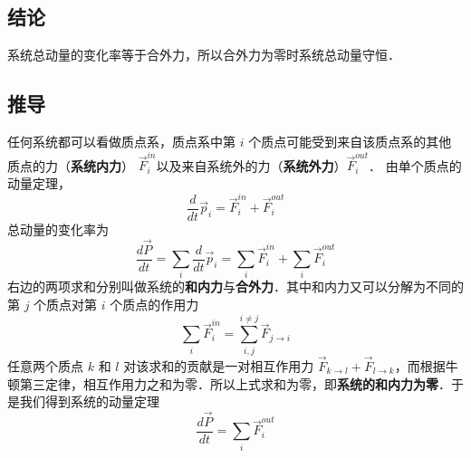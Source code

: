 \subsection{结论}
系统总动量的变化率等于合外力，所以合外力为零时系统总动量守恒．

\subsection{推导}
任何系统都可以看做质点系，质点系中第 $i$ 个质点可能受到来自该质点系的其他质点的力（\textbf{系统内力}） $\vec F_i^{in}$以及来自系统外的力（\textbf{系统外力}）$\vec F_i^{out}$． 由单个质点的动量定理，%
\begin{equation}
\frac{d}{{dt}}{\vec p_i} = \vec F_i^{in} + \vec F_i^{out}
\end{equation}
总动量的变化率为
\begin{equation}
\frac{{d\vec P}}{{dt}} = \sum\limits_i {\frac{d}{{dt}}{{\vec p}_i}}  = \sum\limits_i {\vec F_i^{in}}  + \sum\limits_i {\vec F_i^{out}}
\end{equation}
右边的两项求和分别叫做系统的\textbf{和内力}与\textbf{合外力}．其中和内力又可以分解为不同的第 $j$ 个质点对第 $i$ 个质点的作用力
\begin{equation}
\sum\limits_i {\vec F_i^{in}}  = \sum\limits_{i,j}^{i \ne j} {{{\vec F}_{j \to i}}}
\end{equation}
任意两个质点 $k$ 和 $l$ 对该求和的贡献是一对相互作用力 ${\vec F_{k \to l}} + {\vec F_{l \to k}}$，而根据牛顿第三定律，相互作用力之和为零．所以上式求和为零，即\textbf{系统的和内力为零}．于是我们得到系统的动量定理
\begin{equation}
\frac{{d\vec P}}{{dt}} = \sum\limits_i {\vec F_i^{out}} 
\end{equation}

